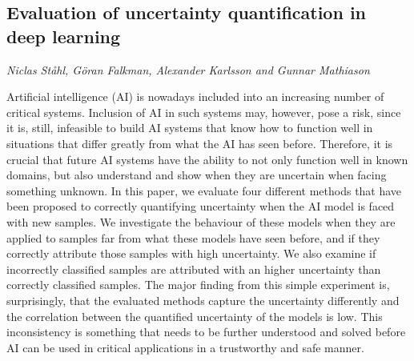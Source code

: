 \documentclass[../booklet.tex]{subfiles}
\begin{document}
\subsection[Evaluation of uncertainty quantification in deep learning. {\it Niclas Ståhl, Göran Falkman, Alexander Karlsson and Gunnar Mathiason}]{Evaluation of uncertainty quantification in deep learning}
   

\begin{center}
  {\it Niclas Ståhl, Göran Falkman, Alexander Karlsson and Gunnar Mathiason}
\end{center}

\vskip 0.8cm


  Artificial intelligence (AI) is nowadays included into an increasing number of critical systems.
  Inclusion of AI in such systems may, however, pose a risk, since it is, still, infeasible to build AI systems that know how to function well in situations that differ greatly from what the AI has seen before.
  Therefore, it is crucial that future AI systems have the ability to not only function well in known domains, but also understand and show when they are uncertain when facing something unknown.
  In this paper, we evaluate four different methods that have been proposed to correctly quantifying uncertainty when the AI model is faced with new samples.
  We investigate the behaviour of these models when they are applied to samples far from what these models have seen before, and if they correctly attribute those samples with high uncertainty.
  We also examine if incorrectly classified samples are attributed with an higher uncertainty than correctly classified samples.
  The major finding from this simple experiment is, surprisingly, that the evaluated methods capture the uncertainty differently and the correlation between the quantified uncertainty of the models is low.
  This inconsistency is something that needs to be further understood and solved before AI can be used in critical applications in a trustworthy and safe manner.
\end{document}
